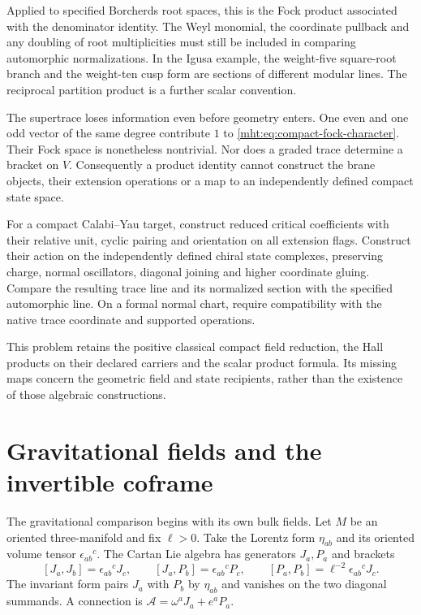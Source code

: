 Applied to specified Borcherds root spaces, this is the Fock product
associated with the denominator identity. The Weyl monomial, the
coordinate pullback and any doubling of root multiplicities must
still be included in comparing automorphic normalizations. In the
Igusa example, the weight-five square-root branch and the weight-ten
cusp form are sections of different modular lines. The reciprocal
partition product is a further scalar convention.

The supertrace loses information even before geometry enters.
One even and one odd vector of the same degree contribute $1$ to
\eqref{mht:eq:compact-fock-character}. Their Fock space is nonetheless
nontrivial. Nor does a graded trace determine a bracket on $V$.
Consequently a product identity cannot construct the brane objects,
their extension operations or a map to an independently defined
compact state space.

\begin{problem}\label{mht:prob:compact-geometric-comparison}
For a compact Calabi--Yau target, construct reduced critical
coefficients with their relative unit, cyclic pairing and orientation
on all extension flags. Construct their action on the independently
defined chiral state complexes, preserving charge, normal oscillators,
diagonal joining and higher coordinate gluing. Compare the resulting
trace line and its normalized section with the specified automorphic
line. On a formal normal chart, require compatibility with the native
trace coordinate and supported operations.
\end{problem}

This problem retains the positive classical compact field reduction,
the Hall products on their declared carriers and the scalar product
formula. Its missing maps concern the geometric field and state
recipients, rather than the existence of those algebraic constructions.

\section{Gravitational fields and the invertible coframe}

The gravitational comparison begins with its own bulk fields.
Let $M$ be an oriented three-manifold and fix $\ell>0$. Take the
Lorentz form $\eta_{ab}$ and its oriented volume tensor
$\epsilon_{ab}{}^c$. The Cartan Lie algebra has generators $J_a,P_a$
and brackets
\[
 [J_a,J_b]=\epsilon_{ab}{}^cJ_c,\qquad
 [J_a,P_b]=\epsilon_{ab}{}^cP_c,\qquad
 [P_a,P_b]=\ell^{-2}\epsilon_{ab}{}^cJ_c.
\]
The invariant form pairs $J_a$ with $P_b$ by $\eta_{ab}$ and vanishes
on the two diagonal summands. A connection is
$\mathcal A=\omega^aJ_a+e^aP_a$.

